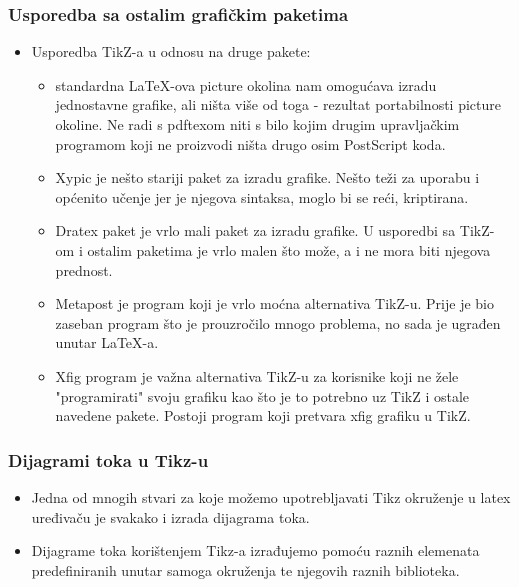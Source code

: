 \documentclass{beamer}
\begin{document}
	\begin{frame}
	\frametitle{Usporedba sa ostalim grafičkim paketima}
		\begin{itemize}
			\item Usporedba TikZ-a u odnosu na druge pakete:
			\begin{itemize}
			\item standardna LaTeX-ova {picture} okolina nam omogućava izradu jednostavne grafike, ali ništa više od toga - rezultat portabilnosti {picture} okoline. Ne radi s pdftexom niti s bilo kojim drugim upravljačkim programom koji ne proizvodi ništa drugo osim PostScript koda.
  			\item Xypic je nešto stariji paket za izradu grafike. Nešto teži za uporabu i općenito učenje jer je njegova sintaksa, moglo bi se reći, kriptirana.
  			\item Dratex paket je vrlo mali paket za izradu grafike. U usporedbi sa TikZ-om i ostalim paketima je vrlo malen što može, a i ne mora biti njegova prednost.
  			\item Metapost je program koji je vrlo moćna alternativa TikZ-u. Prije je bio zaseban program što je prouzročilo mnogo problema, no sada je ugrađen unutar LaTeX-a.
  			\item Xfig program je važna alternativa TikZ-u za korisnike koji ne žele "programirati" svoju grafiku kao što je to potrebno uz TikZ i ostale navedene pakete. Postoji program koji pretvara xfig grafiku u TikZ.
  			\end{itemize}
  		\end{itemize}	
	\end{frame}	

	\begin{frame}
	\frametitle{Dijagrami toka u Tikz-u}
		\begin{itemize}
		\item Jedna od mnogih stvari za koje možemo upotrebljavati Tikz okruženje u latex uređivaču je svakako i izrada dijagrama toka.
		\item Dijagrame toka korištenjem  Tikz-a izrađujemo pomoću raznih elemenata predefiniranih unutar samoga okruženja te njegovih raznih biblioteka.
  		\end{itemize}	
	\end{frame}
\end{document}
